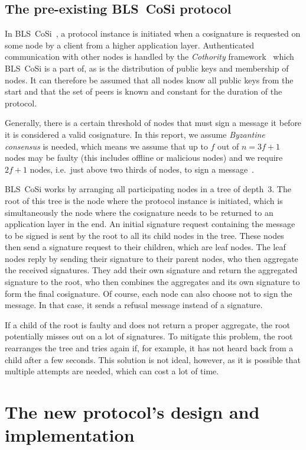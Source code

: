 \subsection{The pre-existing BLS~CoSi protocol}

In BLS~CoSi~\cite{Blscosi}, a protocol instance is initiated when a cosignature is requested on some node by a client from a higher application layer.
Authenticated communication with other nodes is handled by the \emph{Cothority} framework~\cite{Coth} which BLS~CoSi is a part of, as is the distribution of public keys and membership of nodes.
It can therefore be assumed that all nodes know all public keys from the start and that the set of peers is known and constant for the duration of the protocol.

Generally, there is a certain threshold of nodes that must sign a message it before it is considered a valid cosignature.
In this report, we assume \emph{Byzantine consensus} is needed, which means we assume that up to $f$ out of $n = 3f+1$ nodes may be faulty (this includes offline or malicious nodes) and we require $2f+1$ nodes, i.e.~just above two thirds of nodes, to sign a message~\cite{Koko16}.

BLS~CoSi works by arranging all participating nodes in a tree of depth~3.
The root of this tree is the node where the protocol instance is initiated, which is simultaneously the node where the cosignature needs to be returned to an application layer in the end.
An initial signature request containing the message to be signed is sent by the root to all its child nodes in the tree.
These nodes then send a signature request to their children, which are leaf nodes.
The leaf nodes reply by sending their signature to their parent nodes, who then aggregate the received signatures.
They add their own signature and return the aggregated signature to the root, who then combines the aggregates and its own signature to form the final cosignature.
Of course, each node can also choose not to sign the message.
In that case, it sends a refusal message instead of a signature.

If a child of the root is faulty and does not return a proper aggregate, the root potentially misses out on a lot of signatures.
To mitigate this problem, the root rearranges the tree and tries again if, for example, it has not heard back from a child after a few seconds.
This solution is not ideal, however, as it is possible that multiple attempts are needed, which can cost a lot of time.


\section{The new protocol's design and implementation}
\label{implementation}

